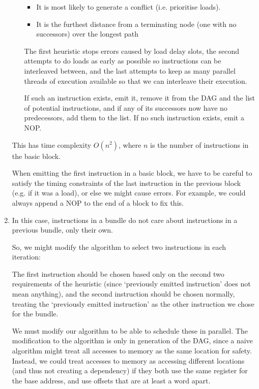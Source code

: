 \begin{enumerate}[label=(\alph*)]
\begin{itemize}
\begin{itemize}
          \item
            It is most likely to generate a conflict (i.e. prioritise loads).

          \item
            It is the furthest distance from a terminating node (one with no successors) over the longest path
        \end{itemize}

        The first heuristic stops errors caused by load delay slots, the second attempts to do loads as early as possible so instructions can be interleaved between, and the last attempts to keep as many parallel threads of execution available so that we can interleave their execution.

        If such an instruction exists, emit it, remove it from the DAG and the list of potential instructions, and if any of its successors now have no predecessors, add them to the list. If no such instruction exists, emit a NOP.
    \end{itemize}

    This has time complexity $O(n^2)$, where $n$ is the number of instructions in the basic block.

    When emitting the first instruction in a basic block, we have to be careful to satisfy the timing constraints of the last instruction in the previous block (e.g. if it was a load), or else we might cause errors. For example, we could always append a NOP to the end of a block to fix this.

  \item
    In this case, instructions in a bundle do not care about instructions in a previous bundle, only their own.

    So, we might modify the algorithm to select two instructions in each iteration:

    The first instruction should be chosen based only on the second two requirements of the heuristic (since `previously emitted instruction' does not mean anything), and the second instruction should be chosen normally, treating the `previously emitted instruction' as the other instruction we chose for the bundle.

    We must modify our algorithm to be able to schedule these in parallel. The modification to the algorithm is only in generation of the DAG, since a naive algorithm might treat all accesses to memory as the same location for safety. Instead, we could treat accesses to memory as accessing different locations (and thus not creating a dependency) if they both use the same register for the base address, and use offsets that are at least a word apart.


\end{enumerate}
